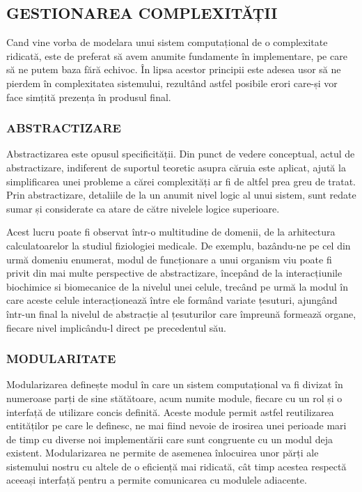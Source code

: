 \documentclass[12pt]{article}
\begin{document}
\subsection{GESTIONAREA COMPLEXITĂȚII}
Cand vine vorba de modelara unui sistem computațional de o complexitate ridicată, este de preferat să avem anumite fundamente în implementare, pe care să ne putem baza fără echivoc. În lipsa acestor principii este adesea usor să ne pierdem în complexitatea sistemului, rezultând astfel posibile erori care-și vor face simțită prezența în produsul final.

\subsubsection{ABSTRACTIZARE}
Abstractizarea este opusul specificității. Din punct de vedere conceptual, actul de abstractizare, indiferent de suportul teoretic asupra căruia este aplicat, ajută la simplificarea unei probleme a cărei complexități ar fi de altfel prea greu de tratat. Prin abstractizare, detaliile de la un anumit nivel logic al unui sistem, sunt redate sumar și considerate ca atare de către nivelele logice superioare.


Acest lucru poate fi observat într-o multitudine de domenii, de la arhitectura calculatoarelor la studiul fiziologiei medicale. De exemplu, bazându-ne pe cel din urmă domeniu enumerat, modul de funcționare a unui organism viu poate fi privit din mai multe perspective de abstractizare, începând de la interacțiunile biochimice si biomecanice de la nivelul unei celule, trecând pe urmă la modul în care aceste celule interacționează între ele formând variate țesuturi, ajungând într-un final la nivelul de abstracție al țesuturilor care împreună formează organe, fiecare nivel implicându-l direct pe precedentul său.

\subsubsection{MODULARITATE}
Modularizarea definește modul în care un sistem computațional va fi divizat în numeroase parți de sine stătătoare, acum numite module, fiecare cu un rol și o interfață de utilizare concis definită. Aceste module permit astfel reutilizarea  entităților pe care le definesc, ne mai fiind nevoie de irosirea unei perioade mari de timp cu diverse noi implementării care sunt congruente cu un modul deja existent. Modularizarea ne permite de asemenea înlocuirea unor părți ale sistemului nostru cu altele de o eficiență mai ridicată, cât timp acestea respectă aceeași interfață pentru a permite comunicarea cu modulele adiacente.
\end{document}
